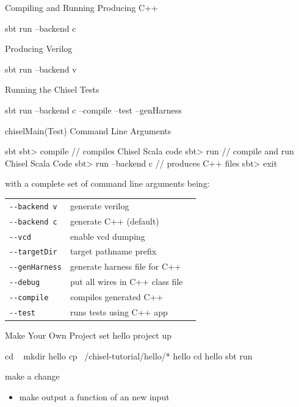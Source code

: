 \documentclass[xcolor=pdflatex,dvipsnames,table]{beamer}
\begin{document}
\begin{frame}[fragile]{Compiling and Running}
Producing C++
\begin{bash}
sbt run --backend c
\end{bash}

Producing Verilog
\begin{bash}
sbt run --backend v
\end{bash}

Running the Chisel Tests
\begin{bash}
sbt run --backend c --compile --test --genHarness
\end{bash}

\end{frame}

\begin{frame}[fragile]{chiselMain(Test) Command Line Arguments}
\begin{scala}
sbt 
sbt> compile         // compiles Chisel Scala code
sbt> run             // compile and run Chisel Scala Code
sbt> run --backend c // produces C++ files
sbt> exit
\end{scala}

with a complete set of command line arguments being:\\[2mm]

\begin{tabular}{lll}
\verb+--backend v+ & generate verilog \\
\verb+--backend c+ & generate C++ (default)\\
\verb+--vcd+ & enable vcd dumping \\
\verb+--targetDir+ & target pathname prefix \\
\verb+--genHarness+ & generate harness file for C++ \\
\verb+--debug+ & put all wires in C++ class file \\
\verb+--compile+ & compiles generated C++ \\
\verb+--test+ & runs tests using C++ app \\
\end{tabular}
\end{frame}

\begin{frame}[fragile]{Make Your Own Project}
set hello project up
\begin{bash}
cd ~
mkdir hello
cp ~/chisel-tutorial/hello/* hello
cd hello
sbt run
\end{bash}
make a change
\begin{itemize}
\item make output a function of an new input 
\end{itemize}
\end{frame}
\end{document}
